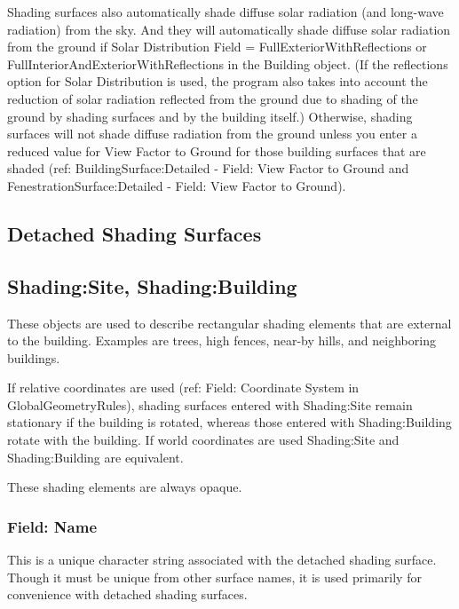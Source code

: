 Shading surfaces also automatically shade diffuse solar radiation (and long-wave radiation) from the sky. And they will automatically shade diffuse solar radiation from the ground if Solar Distribution Field = FullExteriorWithReflections or FullInteriorAndExteriorWithReflections in the Building object. (If the reflections option for Solar Distribution is used, the program also takes into account the reduction of solar radiation reflected from the ground due to shading of the ground by shading surfaces and by the building itself.) Otherwise, shading surfaces will not shade diffuse radiation from the ground unless you enter a reduced value for View Factor to Ground for those building surfaces that are shaded (ref: BuildingSurface:Detailed - Field: View Factor to Ground and FenestrationSurface:Detailed - Field: View Factor to Ground).

\subsection{Detached Shading Surfaces}\label{detached-shading-surfaces}

\subsection{Shading:Site, Shading:Building}\label{shadingsite-shadingbuilding}

These objects are used to describe rectangular shading elements that are external to the building. Examples are trees, high fences, near-by hills, and neighboring buildings.

If relative coordinates are used (ref: Field: Coordinate System in GlobalGeometryRules), shading surfaces entered with Shading:Site remain stationary if the building is rotated, whereas those entered with Shading:Building rotate with the building. If world coordinates are used Shading:Site and Shading:Building are equivalent.

These shading elements are always opaque.

\subsubsection{Field: Name}\label{field-name-22-004}

This is a unique character string associated with the detached shading surface. Though it must be unique from other surface names, it is used primarily for convenience with detached shading surfaces.

